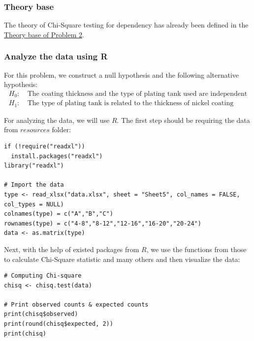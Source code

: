 \documentclass[a4paper]{article}
\numberwithin{equation}{section}
\begin{document}
\subsubsection{Theory base}
The theory of Chi-Square testing for dependency has already been defined in the \hyperref[p2:theory]{\underline{Theory base of Problem 2}}.

\subsubsection{Analyze the data using R}
For this problem, we construct a null hypothesis and the following alternative hypothesis:
\begin{align*}
  H_0: & \ \text{The coating thickness and the type of plating tank used are independent} \\
  H_1: & \ \text{The type of plating tank is related to the thickness of nickel coating}
\end{align*}

For analyzing the data, we will use \(R\). The first step should be requiring the data from \(resources\) folder:
\begin{mdframed}[leftline=false,rightline=false,backgroundcolor=magenta!10,nobreak=true]
  \begin{verbatim}
if (!require("readxl"))
  install.packages("readxl")
library("readxl")

# Import the data
type <- read_xlsx("data.xlsx", sheet = "Sheet5", col_names = FALSE, col_types = NULL)
colnames(type) = c("A","B","C")
rownames(type) = c("4-8","8-12","12-16","16-20","20-24")
data <- as.matrix(type)
  \end{verbatim}
\end{mdframed}

Next, with the help of existed packages from \(R\), we use the functions from those to calculate Chi-Square statistic and many others and then visualize the data:
\begin{mdframed}[leftline=false,rightline=false,backgroundcolor=magenta!10,nobreak=true]
  \begin{verbatim}
# Computing Chi-square
chisq <- chisq.test(data)

# Print observed counts & expected counts
print(chisq$observed)
print(round(chisq$expected, 2))
print(chisq)
  \end{verbatim}
\end{mdframed}
\end{document}
